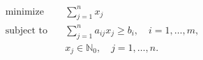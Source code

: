 \begin{align*}
\text{minimize} \quad & \sum_{j=1}^n x_j \\
\text{subject to} \quad & \sum_{j=1}^n a_{ij} x_j \geq b_i, \quad i = 1, \ldots, m, \\
& x_j \in \mathbb{N}_0, \quad j = 1, \ldots, n.
\end{align*}


